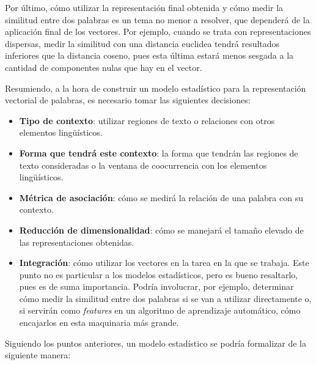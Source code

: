 Por último, cómo utilizar la representación final obtenida y cómo medir la similitud entre dos
palabras es un tema no menor a resolver, que dependerá de la aplicación final de los vectores. Por
ejemplo, cuando se trata con representaciones dispersas, medir la similitud con una distancia
euclidea tendrá resultados inferiores que la distancia coseno, pues esta última estará menos sesgada
a la cantidad de componentes nulas que hay en el vector.

Resumiendo, a la hora de construir un modelo estadístico para la representación vectorial de
palabras, es necesario tomar las siguientes decisiones:

\begin{itemize}

\item \textbf{Tipo de contexto}: utilizar regiones de texto o relaciones con otros elementos
lingüísticos.

\item \textbf{Forma que tendrá este contexto}: la forma que tendrán las regiones de texto
consideradas o la ventana de coocurrencia con los elementos lingüísticos.

\item \textbf{Métrica de asociación}: cómo se medirá la relación de una palabra con su contexto.

\item \textbf{Reducción de dimensionalidad}: cómo se manejará el tamaño elevado de las
representaciones obtenidas.

\item \textbf{Integración}: cómo utilizar los vectores en la tarea en la que se trabaja. Este punto
no es particular a los modelos estadísticos, pero es bueno resaltarlo, pues es de suma
importancia. Podría involucrar, por ejemplo, determinar cómo medir la similitud entre dos palabras
si se van a utilizar directamente o, si servirán como \textit{features} en un algoritmo de
aprendizaje automático, cómo encajarlos en esta maquinaria más grande.

\end{itemize}

Siguiendo los puntos anteriores, un modelo estadístico se podría formalizar de la siguiente manera:

